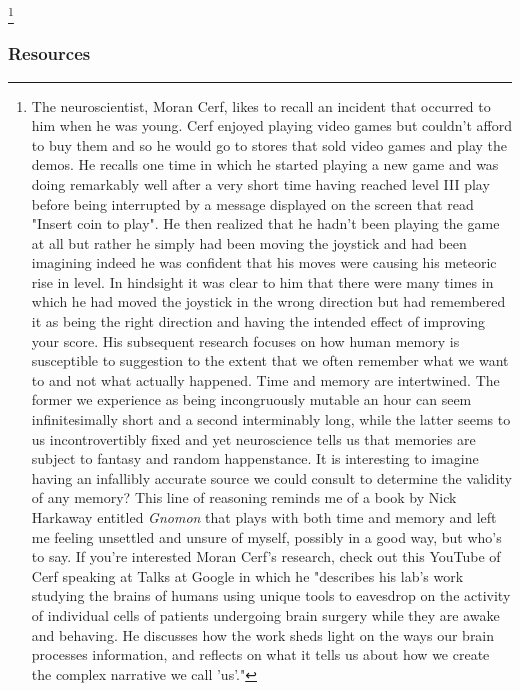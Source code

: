 \footnote{%
%
  The neuroscientist, Moran Cerf, likes to recall an incident that occurred to him when he was young. Cerf enjoyed playing video games but couldn't afford to buy them and so he would go to stores that sold video games and play the demos. He recalls one time in which he started playing a new game and was doing remarkably well after a very short time having reached level III play before being interrupted by a message displayed on the screen that read "Insert coin to play". He then realized that he hadn't been playing the game at all but rather he simply had been moving the joystick and had been imagining \emdash{} indeed he was confident that \emdash{} his moves were causing his meteoric rise in level. In hindsight it was clear to him that there were many times in which he had moved the joystick in the wrong direction but had remembered it as being the right direction and having the intended effect of improving your score. His subsequent research focuses on how human memory is susceptible to suggestion to the extent that we often remember what we want to and not what actually happened. Time and memory are intertwined. The former we experience as being incongruously mutable \emdash{} an hour can seem infinitesimally short and a second interminably long, while the latter seems to us incontrovertibly fixed and yet neuroscience tells us that memories are subject to fantasy and random happenstance. It is interesting to imagine having an infallibly accurate source we could consult to determine the validity of any memory?  This line of reasoning reminds me of a book by Nick Harkaway entitled {\it{Gnomon}} that plays with both time and memory and left me feeling unsettled and unsure of myself, possibly in a good way, but who's to say. If you're interested Moran Cerf's research, check out this YouTube{} of Cerf speaking at Talks at Google in which he "describes his lab's work studying the brains of humans using unique tools to eavesdrop on the activity of individual cells of patients undergoing brain surgery while they are awake and behaving. He discusses how the work sheds light on the ways our brain processes information, and reflects on what it tells us about how we create the complex narrative we call 'us'."}


\subsubsection*{Resources}

